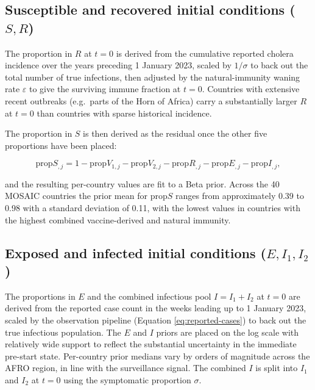 \documentclass[
]{book}
\begin{document}
\subsection{\texorpdfstring{Susceptible and recovered initial conditions (\(S, R\))}{Susceptible and recovered initial conditions (S, R)}}\label{susceptible-and-recovered-initial-conditions-s-r}

The proportion in \(R\) at \(t = 0\) is derived from the cumulative reported cholera incidence over the years preceding 1 January 2023, scaled by \(1/\sigma\) to back out the total number of true infections, then adjusted by the natural-immunity waning rate \(\varepsilon\) to give the surviving immune fraction at \(t = 0\). Countries with extensive recent outbreaks (e.g.~parts of the Horn of Africa) carry a substantially larger \(R\) at \(t = 0\) than countries with sparse historical incidence.

The proportion in \(S\) is then derived as the residual once the other five proportions have been placed:

\[
\text{prop}S_{,j} = 1 - \text{prop}V_{1,j} - \text{prop}V_{2,j} - \text{prop}R_{,j} - \text{prop}E_{,j} - \text{prop}I_{,j},
\]

and the resulting per-country values are fit to a Beta prior. Across the 40 MOSAIC countries the prior mean for \(\text{prop}S\) ranges from approximately 0.39 to 0.98 with a standard deviation of 0.11, with the lowest values in countries with the highest combined vaccine-derived and natural immunity.

\subsection{\texorpdfstring{Exposed and infected initial conditions (\(E, I_1, I_2\))}{Exposed and infected initial conditions (E, I\_1, I\_2)}}\label{exposed-and-infected-initial-conditions-e-i_1-i_2}

The proportions in \(E\) and the combined infectious pool \(I = I_1 + I_2\) at \(t = 0\) are derived from the reported case count in the weeks leading up to 1 January 2023, scaled by the observation pipeline (Equation \eqref{eq:reported-cases}) to back out the true infectious population. The \(E\) and \(I\) priors are placed on the log scale with relatively wide support to reflect the substantial uncertainty in the immediate pre-start state. Per-country prior medians vary by orders of magnitude across the AFRO region, in line with the surveillance signal. The combined \(I\) is split into \(I_1\) and \(I_2\) at \(t = 0\) using the symptomatic proportion \(\sigma\).
\end{document}
